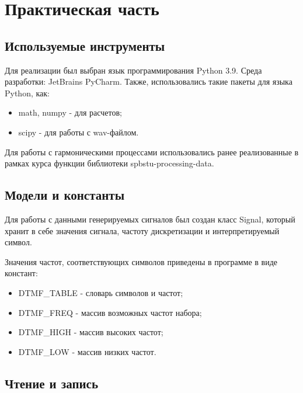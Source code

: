\chapter{Практическая часть} \label{ch2}
	

\section{Используемые инструменты} \label{ch2:title-abbr} %
	Для реализации был выбран язык программирования Python 3.9. Среда разработки: JetBrains PyCharm.
	Также, использовались такие пакеты для языка Python, как: 
\begin{itemize}
	\item math, numpy - для расчетов;
	\item scipy - для работы с wav-файлом.
\end{itemize}

Для работы с гармоническими процессами использовались ранее реализованные в рамках курса \cite{bel} функции библиотеки spbstu-processing-data. 

\section{Модели и константы}

Для работы с данными генерируемых сигналов был создан класс Signal, который хранит в себе значения сигнала, частоту дискретизации и интерпретируемый символ.

Значения частот, соответствующих символов приведены в программе в виде констант:
\begin{itemize}
	\item DTMF\_TABLE - словарь символов и частот;
	\item DTMF\_FREQ - массив возможных частот набора;
	\item DTMF\_HIGH - массив высоких частот;
	\item DTMF\_LOW - массив низких частот.
\end{itemize}

\section{Чтение и запись}

